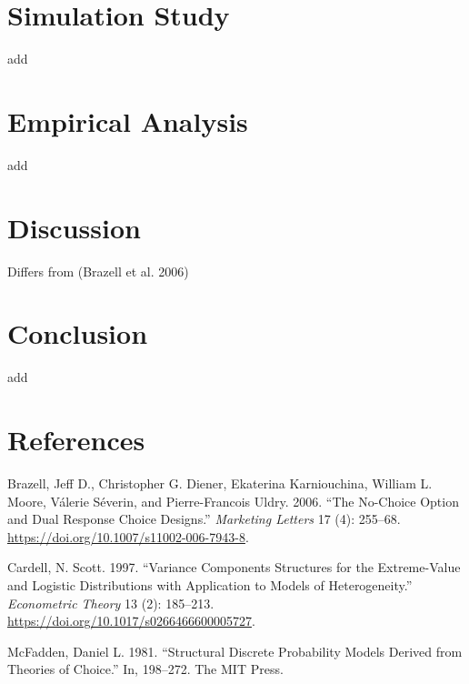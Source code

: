 \documentclass[
]{article}
\newlength{\cslhangindent}
\newenvironment{CSLReferences}[2] %
 {\begin{list}{}{%
  \setlength{\itemindent}{0pt}
  \setlength{\leftmargin}{0pt}
  \setlength{\parsep}{0pt}
  \ifodd #1
   \setlength{\leftmargin}{\cslhangindent}
   \setlength{\itemindent}{-1\cslhangindent}
  \fi
  \setlength{\itemsep}{#2\baselineskip}}}
 {\end{list}}
\begin{document}
\section{Simulation Study}\label{sec-simstudy}

add

\section{Empirical Analysis}\label{sec-analysis}

add

\section{Discussion}\label{sec-discussion}

Differs from (Brazell et al. 2006)

\section{Conclusion}\label{sec-conclusion}

add

\section*{References}\label{references}

\label{refs}
\begin{CSLReferences}{1}{0}
Brazell, Jeff D., Christopher G. Diener, Ekaterina Karniouchina, William
L. Moore, Válerie Séverin, and Pierre-Francois Uldry. 2006. {``The
No-Choice Option and Dual Response Choice Designs.''} \emph{Marketing
Letters} 17 (4): 255--68.
\url{https://doi.org/10.1007/s11002-006-7943-8}.

Cardell, N. Scott. 1997. {``Variance Components Structures for the
Extreme-Value and Logistic Distributions with Application to Models of
Heterogeneity.''} \emph{Econometric Theory} 13 (2): 185--213.
\url{https://doi.org/10.1017/s0266466600005727}.

McFadden, Daniel L. 1981. {``Structural Discrete Probability Models
Derived from Theories of Choice.''} In, 198--272. The MIT Press.

\end{CSLReferences}
\end{document}
